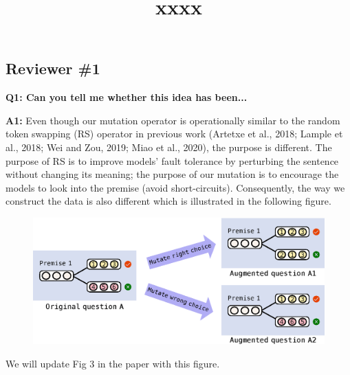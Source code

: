 \documentclass[letterpaper]{article}
\title{xxxx}
\author{}
\date{}
\newcommand{\figref}[1]{Figure \ref{#1}}
\begin{document}
\subsection{Reviewer \#1}
\textbf{Q1: Can you tell me whether this idea has been...}

\noindent
\textbf{A1:} Even though our mutation operator is operationally similar to the random token 
swapping (RS) operator in previous work
(Artetxe et al., 2018; Lample et al., 2018; Wei and Zou, 2019; Miao et al., 2020), 
the purpose is different.
The purpose of RS is to improve models' fault tolerance by perturbing 
the sentence without changing its meaning; 
the purpose of our mutation is to encourage the models to look into the 
premise (avoid short-circuits). 
Consequently, the way we construct the data is also different which is 
illustrated in the following figure. 
\begin{figure}[th]
 	\centering
 	\includegraphics[width=0.9\columnwidth]{figure/revised_mutation.eps}
 	\label{fig:mutation}
\end{figure}
We will update Fig 3 in the paper with this figure. 

\end{document}

